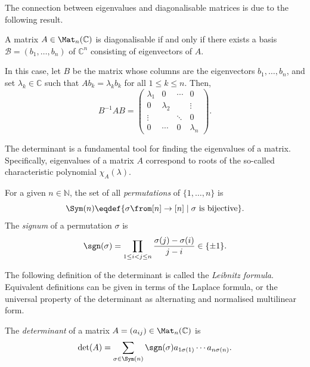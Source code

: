 \documentclass[a4paper,oneside, 12pt]{amsart}
\begin{document}
The connection between eigenvalues and diagonalisable matrices is due to the following result.

\begin{proposition}\label{prop:diag-iff-basis-of-eigenvalues}
  A matrix \( A \in \Mat_{n}(\mathbb{C}) \) is diagonalisable if and only if there exists a basis \( \mathcal{B} = (b_1, \dots, b_n) \) of \( \mathbb{C}^n \) consisting of eigenvectors of \( A \).

  In this case, let \( B \) be the matrix whose columns are the eigenvectors \( b_1, \dots, b_n \), and set \( \lambda_k \in \mathbb{C} \)  such that \(Ab_{k}=\lambda_{k}b_{k}\) for all \(1\le k \leq n\).
  Then,
  \begin{equation}
    B^{-1} A B =
    \begin{pmatrix}
      \lambda_1 & 0 & \cdots & 0 \\
      0 & \lambda_2 & & \vdots \\
      \vdots & & \ddots & 0 \\
      0 & \cdots & 0 & \lambda_n
    \end{pmatrix}.
  \end{equation}
\end{proposition}

The determinant is a fundamental tool for finding the eigenvalues of a matrix.
Specifically, eigenvalues of a matrix \(A\) correspond to roots of the so-called characteristic polynomial \(\chi_{A}(\lambda)\).

\begin{definition}\label{def:permutation}
  For a given \( n \in \mathbb{N} \), the set of all \emph{permutations} of \( \{1, \dots, n\} \) is
  \begin{equation}
    \Sym(n) \eqdef \{\sigma \from [n] \to [n] \mid \sigma \text{ is bijective}\}.
  \end{equation}
  The \emph{signum} of a permutation \( \sigma \) is
  \begin{equation}
    \sgn(\sigma) = \prod_{1\leq i<j \leq n}\frac{\sigma(j)-\sigma(i)}{j-i} \in \{\pm 1\}.
  \end{equation}
\end{definition}

The following definition of the determinant is called the \emph{ Leibnitz formula}.
Equivalent definitions can be given in terms of the Laplace formula, or the universal property of the determinant as alternating and normalised multilinear form.
\begin{definition}\label{def:determinant}
  The \emph{determinant} of a matrix \( A = (a_{ij}) \in \Mat_n(\mathbb{C}) \) is
  \begin{equation}
    \det(A) = \sum_{\sigma \in \Sym(n)} \sgn(\sigma) a_{1\sigma(1)} \cdots a_{n\sigma(n)}.
  \end{equation}
\end{definition}
\end{document}
